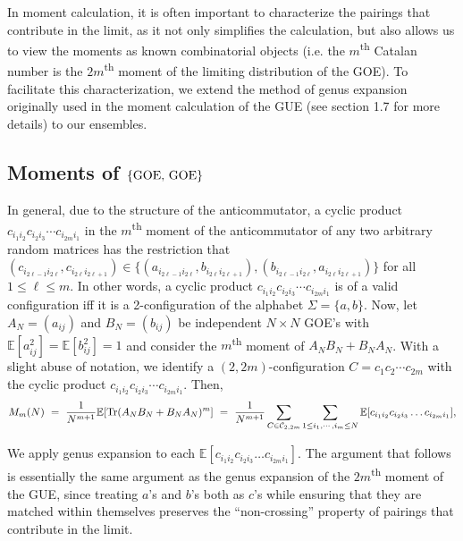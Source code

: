 \documentclass[11pt,reqno]{amsart}
\numberwithin{equation}{section}
\theoremstyle{plain}
\begin{document}
In moment calculation, it is often important to characterize the pairings that contribute in the limit, as it not only simplifies the calculation, but also allows us to view the moments as known combinatorial objects (i.e. the $m$\textsuperscript{th} Catalan number is the $2m$\textsuperscript{th} moment of the limiting distribution of the GOE). To facilitate this characterization, we extend the method of genus expansion originally used in the moment calculation of the GUE (see \cite{MS} section 1.7 for more details) to our ensembles.

\subsection{Moments of $\{\textup{GOE, GOE}\}$}\label{momentGOEGOE} In general, due to the structure of the anticommutator, a cyclic product $c_{i_1i_2}c_{i_2i_3}\cdots c_{i_{2m}i_1}$ in the $m$\textsuperscript{th} moment of the anticommutator of any two arbitrary random matrices has the restriction that $(c_{i_{2\ell-1}i_{2\ell}}, c_{i_{2\ell}i_{2\ell+1}})\in \{(a_{i_{2\ell-1}i_{2\ell}}, b_{i_{2\ell}i_{2\ell+1}}),(b_{i_{2\ell-1}i_{2\ell}}, a_{i_{2\ell}i_{2\ell+1}})\}$ for all $1\leq \ell\leq m$. In other words, a cyclic product $c_{i_1i_2}c_{i_2i_3}\cdots c_{i_{2m}i_1}$ is of a valid configuration iff it is a 2-configuration of the alphabet $\Sigma=\{a,b\}$. Now, let $A_N=(a_{ij})$ and $B_N=(b_{ij})$ be independent $N\times N$ GOE's with $\mathbb{E}[a_{ij}^2]=\mathbb{E}[b_{ij}^2]=1$ and consider the $m$\textsuperscript{th} moment of $A_NB_N+B_NA_N$. With a slight abuse of notation, we identify a $(2,2m)$-configuration $C=c_1c_2\cdots c_{2m}$ with the cyclic product $c_{i_1i_2}c_{i_2i_3}\cdots c_{i_{2m}i_1}$. Then,
\begin{align}
M_m(N) \ = \ \frac{1}{N^{m+1}}\mathbb{E}[\textup{Tr}(A_NB_N+B_NA_N)^m] \ = \ \frac{1}{N^{m+1}}\sum_{C\in\mathcal{C}_{2,2m}}\sum_{1\leq i_1,\cdots, i_m\leq N}\mathbb{E}[c_{i_1i_2}c_{i_2i_3}\dots c_{i_{2m}i_1}],  
\end{align}

We apply genus expansion to each $\mathbb{E}[c_{i_1i_2}c_{i_2i_3}\dots c_{i_{2m}i_1}]$. The argument that follows is essentially the same argument as the genus expansion of the $2m$\textsuperscript{th} moment of the GUE, since treating $a$'s and $b$'s both as $c$'s while ensuring that they are matched within themselves preserves the ``non-crossing'' property of pairings that contribute in the limit.
\end{document}
